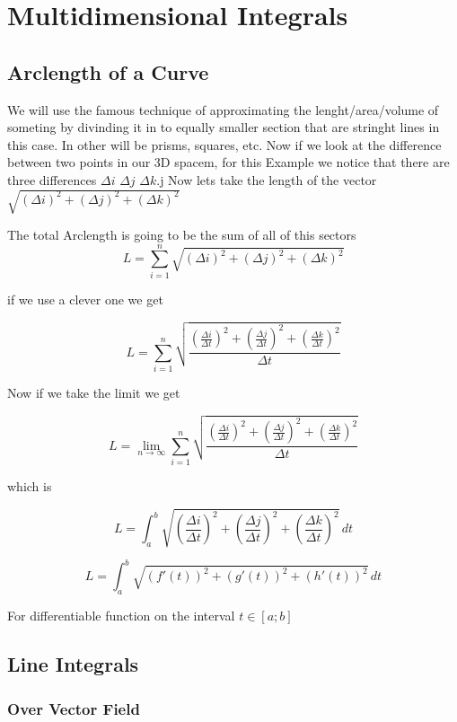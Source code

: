 \section{Multidimensional Integrals}

\subsection{Arclength of a Curve}

We will use the famous technique of approximating the lenght/area/volume of someting
by divinding it in to equally smaller section that are stringht lines in this case. In other will
be prisms, squares, etc. Now if we look at the difference between two points in our 3D spacem, for this Example
we notice that there are three differences \(\Delta i\) \(\Delta j\) \(\Delta k\).j
Now lets take the length of the vector \(\sqrt{(\Delta i)^2 + (\Delta j)^2 + (\Delta k)^2}\)

The total Arclength is going to be the sum of all of this sectors
\[
L =  \sum_{i = 1}^{n}\sqrt{(\Delta i)^2 + (\Delta j)^2 + (\Delta k)^2}
\]

if we use a clever one we get

\[
L =  \sum_{i = 1}^{n}\sqrt{\frac{\left(\frac{\Delta i}{\Delta t}\right)^2 + \left(\frac{\Delta j}{\Delta t}\right)^2 + \left(\frac{\Delta k}{\Delta t}\right)^2}{\Delta t}}
\]

Now if we take the limit we get

\[
L =  \lim_{n\to \infty}\sum_{i = 1}^{n}\sqrt{\frac{\left(\frac{\Delta i}{\Delta t}\right)^2 + \left(\frac{\Delta j}{\Delta t}\right)^2 + \left(\frac{\Delta k}{\Delta t}\right)^2}{\Delta t}}
\]

which is 

\[
L =  \int_{a}^{b}\sqrt{\left(\frac{\Delta i}{\Delta t}\right)^2 + \left(\frac{\Delta j}{\Delta t}\right)^2 + \left(\frac{\Delta k}{\Delta t}\right)^2}\,dt
\]

\[
L =  \int_{a}^{b}\sqrt{(f'(t))^2 + (g'(t))^2 + (h'(t))^2}\,dt
\]

For differentiable function on the interval \(t \in [a; b]\)

\subsection{Line Integrals}

\subsubsection{Over Vector Field}

